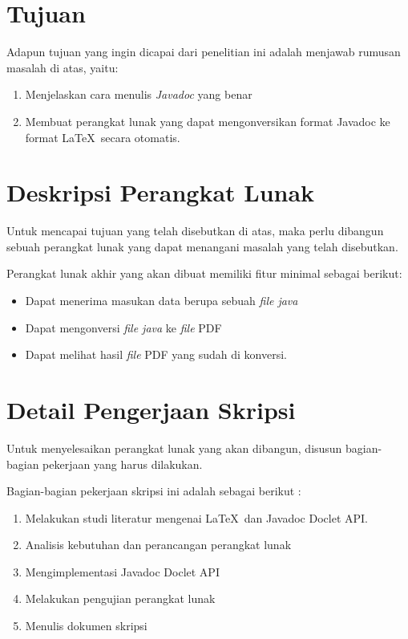 \documentclass[a4paper,twoside]{article}
\begin{document}
\section{Tujuan}
Adapun tujuan yang ingin dicapai dari penelitian ini adalah menjawab rumusan masalah di atas, yaitu:
\begin{enumerate}
	\item Menjelaskan cara menulis {\it Javadoc} yang benar
	\item Membuat perangkat lunak yang dapat mengonversikan format Javadoc ke format \LaTeX\ secara otomatis.
\end{enumerate}

\section{Deskripsi Perangkat Lunak}
Untuk mencapai tujuan yang telah disebutkan di atas, maka perlu dibangun sebuah perangkat lunak yang dapat menangani masalah yang telah disebutkan.

Perangkat lunak akhir yang akan dibuat memiliki fitur minimal sebagai berikut:
\begin{itemize}
	\item Dapat menerima masukan data berupa sebuah {\it file java}
	\item Dapat mengonversi {\it file java} ke {\it file} PDF
	\item Dapat melihat hasil {\it file} PDF yang sudah di konversi.
\end{itemize}

\section{Detail Pengerjaan Skripsi}
Untuk menyelesaikan perangkat lunak yang akan dibangun, disusun bagian-bagian pekerjaan yang harus dilakukan.

Bagian-bagian pekerjaan skripsi ini adalah sebagai berikut :
	\begin{enumerate}
		\item Melakukan studi literatur mengenai \LaTeX\ dan Javadoc Doclet API.
		\item Analisis kebutuhan dan perancangan perangkat lunak
		\item Mengimplementasi Javadoc Doclet API 
		\item Melakukan pengujian perangkat lunak
		\item Menulis dokumen skripsi
	\end{enumerate}
\end{document}
